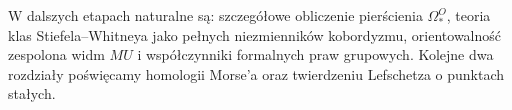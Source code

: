 W dalszych etapach naturalne są: szczegółowe obliczenie
pierścienia $\Omega_*^O$, teoria klas Stiefela--Whitneya
jako pełnych niezmienników kobordyzmu, orientowalność
zespolona widm $MU$ i współczynniki formalnych praw
grupowych. Kolejne dwa rozdziały poświęcamy homologii Morse'a oraz
twierdzeniu Lefschetza o punktach stałych.


